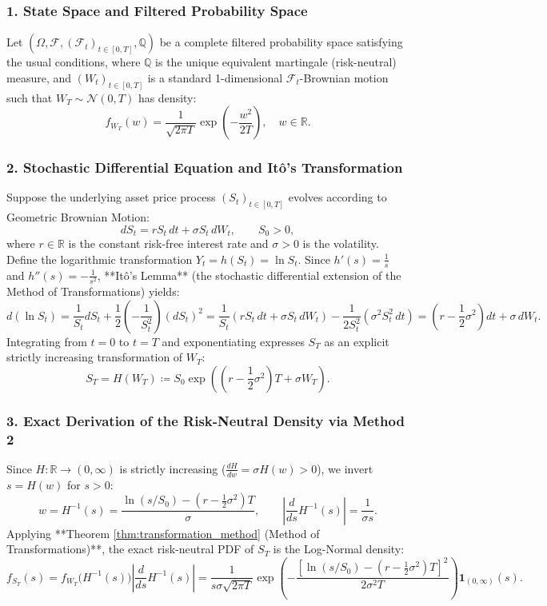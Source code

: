 \documentclass[11pt, letterpaper]{article}
\theoremstyle{definition}
\theoremstyle{remark}
\newcommand{\R}{\mathbb{R}}
\newcommand{\F}{\mathcal{F}}
\begin{document}
\begin{itemize}
\subsubsection*{1. State Space and Filtered Probability Space}
Let $(\Omega, \F, (\F_t)_{t \in [0, T]}, \mathbb{Q})$ be a complete filtered probability space satisfying the usual conditions, where $\mathbb{Q}$ is the unique equivalent martingale (risk-neutral) measure, and $(W_t)_{t \in [0, T]}$ is a standard 1-dimensional $\F_t$-Brownian motion such that $W_T \sim \mathcal{N}(0, T)$ has density:
\[
    f_{W_T}(w) = \frac{1}{\sqrt{2\pi T}} \exp\left(-\frac{w^2}{2T}\right), \quad w \in \R.
\]

\subsubsection*{2. Stochastic Differential Equation and Itô's Transformation}
Suppose the underlying asset price process $(S_t)_{t \in [0, T]}$ evolves according to Geometric Brownian Motion:
\[
    dS_t = r S_t \, dt + \sigma S_t \, dW_t, \qquad S_0 > 0,
\]
where $r \in \R$ is the constant risk-free interest rate and $\sigma > 0$ is the volatility. Define the logarithmic transformation $Y_t = h(S_t) = \ln S_t$. Since $h'(s) = \frac{1}{s}$ and $h''(s) = -\frac{1}{s^2}$, **Itô's Lemma** (the stochastic differential extension of the Method of Transformations) yields:
\[
    d(\ln S_t) = \frac{1}{S_t} dS_t + \frac{1}{2}\left(-\frac{1}{S_t^2}\right) (dS_t)^2 = \frac{1}{S_t}(r S_t \, dt + \sigma S_t \, dW_t) - \frac{1}{2 S_t^2}(\sigma^2 S_t^2 \, dt) = \left(r - \frac{1}{2}\sigma^2\right) dt + \sigma \, dW_t.
\]
Integrating from $t = 0$ to $t = T$ and exponentiating expresses $S_T$ as an explicit strictly increasing transformation of $W_T$:
\[
    S_T = H(W_T) \coloneqq S_0 \exp\left(\left(r - \frac{1}{2}\sigma^2\right)T + \sigma W_T\right).
\]

\subsubsection*{3. Exact Derivation of the Risk-Neutral Density via Method 2}
Since $H: \R \to (0, \infty)$ is strictly increasing ($\frac{dH}{dw} = \sigma H(w) > 0$), we invert $s = H(w)$ for $s > 0$:
\[
    w = H^{-1}(s) = \frac{\ln(s / S_0) - \left(r - \frac{1}{2}\sigma^2\right)T}{\sigma}, \qquad \left|\frac{d}{ds} H^{-1}(s)\right| = \frac{1}{\sigma s}.
\]
Applying **Theorem \ref{thm:transformation_method} (Method of Transformations)**, the exact risk-neutral PDF of $S_T$ is the Log-Normal density:
\[
    f_{S_T}(s) = f_{W_T}\big(H^{-1}(s)\big) \left|\frac{d}{ds} H^{-1}(s)\right| = \frac{1}{s \sigma \sqrt{2\pi T}} \exp\left( -\frac{\left[\ln(s / S_0) - \left(r - \frac{1}{2}\sigma^2\right)T\right]^2}{2\sigma^2 T} \right) \mathbf{1}_{(0, \infty)}(s).
\]


\end{itemize}
\end{document}
